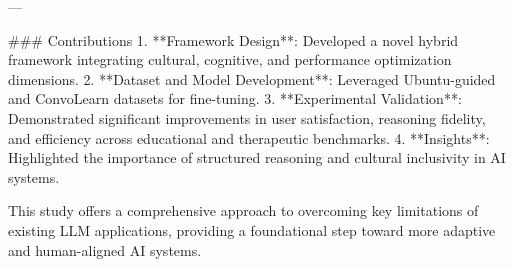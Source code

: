 ---

### Contributions
1. **Framework Design**: Developed a novel hybrid framework integrating cultural, cognitive, and performance optimization dimensions.
2. **Dataset and Model Development**: Leveraged Ubuntu-guided and ConvoLearn datasets for fine-tuning.
3. **Experimental Validation**: Demonstrated significant improvements in user satisfaction, reasoning fidelity, and efficiency across educational and therapeutic benchmarks.
4. **Insights**: Highlighted the importance of structured reasoning and cultural inclusivity in AI systems. 

This study offers a comprehensive approach to overcoming key limitations of existing LLM applications, providing a foundational step toward more adaptive and human-aligned AI systems.
